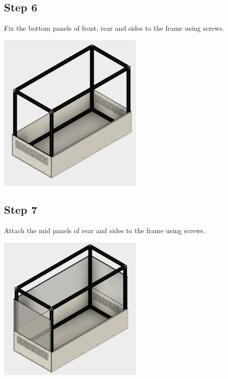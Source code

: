 \documentclass[a4paper,12pt,oneside]{book}
\begin{document}
\subsection*{Step 6}
Fix the bottom panels of front, rear and sides to the frame using screws.\\
\begin{center}
  \includegraphics[width=200pt]{6}
  \end{center}
\subsection*{Step 7}
Attach the mid panels of rear and sides to the frame using screws.\\
\begin{center}
  \includegraphics[width=200pt]{7}
  \end{center}
\end{document}
